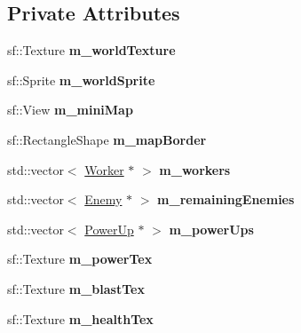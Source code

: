 \subsection*{Private Attributes}
\begin{DoxyCompactItemize}
\item 
\mbox{\label{class_game_a3791cdf694d6610f50ad6096a78ccd85}} 
sf\+::\+Texture {\bfseries m\+\_\+world\+Texture}
\item 
\mbox{\label{class_game_afe284d6a275b05722d56eeabb9e64902}} 
sf\+::\+Sprite {\bfseries m\+\_\+world\+Sprite}
\item 
\mbox{\label{class_game_a99d18f21435cd983388097ec23772175}} 
sf\+::\+View {\bfseries m\+\_\+mini\+Map}
\item 
\mbox{\label{class_game_a9e8e2376034c2665492ba3c2b719d31f}} 
sf\+::\+Rectangle\+Shape {\bfseries m\+\_\+map\+Border}
\item 
\mbox{\label{class_game_a9d2ad349c6454740f202ec75ee7041cf}} 
std\+::vector$<$ \mbox{\hyperlink{class_worker}{Worker}} $\ast$ $>$ {\bfseries m\+\_\+workers}
\item 
\mbox{\label{class_game_abe0d0b5407db443a19c5d49686d42bee}} 
std\+::vector$<$ \mbox{\hyperlink{class_enemy}{Enemy}} $\ast$ $>$ {\bfseries m\+\_\+remaining\+Enemies}
\item 
\mbox{\label{class_game_ad1dba8fd74497954716c1210951fc8f9}} 
std\+::vector$<$ \mbox{\hyperlink{class_power_up}{Power\+Up}} $\ast$ $>$ {\bfseries m\+\_\+power\+Ups}
\item 
\mbox{\label{class_game_a5fc54f9e38842296763277991f640d39}} 
sf\+::\+Texture {\bfseries m\+\_\+power\+Tex}
\item 
\mbox{\label{class_game_a92be945c6cc98d56a5dbeef64a9289b3}} 
sf\+::\+Texture {\bfseries m\+\_\+blast\+Tex}
\item 
\mbox{\label{class_game_a86ce8939c9ec47b8748aae570e642711}} 
sf\+::\+Texture {\bfseries m\+\_\+health\+Tex}
\item 

\end{DoxyCompactItemize}
